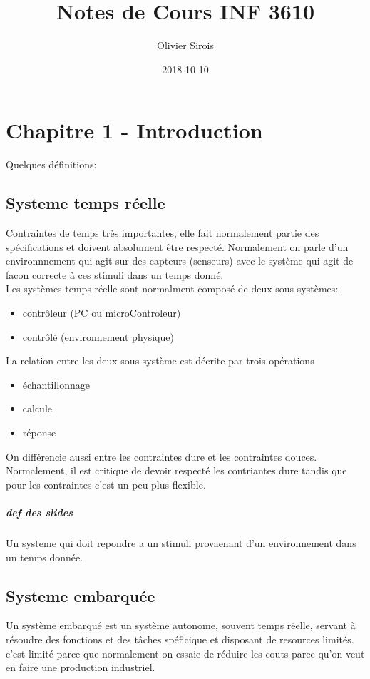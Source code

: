 \documentclass[oneside]{book}
\title{Notes de Cours INF 3610}
\date{2018-10-10}
\author{Olivier Sirois}
\begin{document}
    \setcounter{page}{1}
    \maketitle
    \tableofcontents
    \chapter{Chapitre 1 - Introduction}
    Quelques définitions:\\
    
    \section{Systeme temps réelle}
    Contraintes de temps très importantes, elle fait normalement partie des spécifications et doivent absolument être respecté. Normalement on parle d'un environnnement qui agit sur des capteurs (senseurs) avec le système qui agit de facon correcte à ces stimuli dans un temps donné.\\
    
    Les systèmes temps réelle sont normalment composé de deux sous-systèmes:
    \begin{itemize}
        \item contrôleur (PC ou microControleur)
        \item contrôlé (environnement physique)
    \end{itemize}

    La relation entre les deux sous-système est décrite par trois opérations
    \begin{itemize}
        \item échantillonnage
        \item calcule
        \item réponse
    \end{itemize}

    On différencie aussi entre les contraintes dure et les contraintes douces. Normalement, il est critique de devoir respecté les contriantes dure tandis que pour les contraintes c'est un peu plus flexible.
    \paragraph{def des slides}
    Un systeme qui doit repondre a un stimuli provaenant d'un environnement dans un temps donnée.\\
    
    \section{Systeme embarquée}
    Un système embarqué est un système autonome, souvent temps réelle, servant à résoudre des fonctions et des tâches spéficique et disposant de resources limités. c'est limité parce que normalement on essaie de réduire les couts parce qu'on veut en faire une production industriel.\\
    
\end{document}
